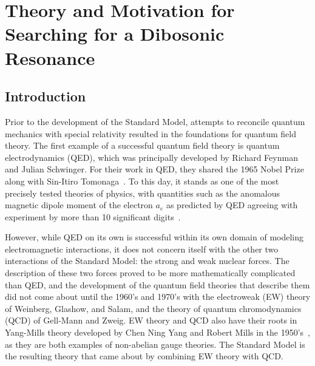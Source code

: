 
\chapter{Theory and Motivation for Searching for a Dibosonic Resonance}
\label{chap:theory}

\section{Introduction}

Prior to the development of the Standard Model, attempts to reconcile quantum mechanics with special relativity resulted in the foundations for quantum field theory.
The first example of a successful quantum field theory is quantum electrodynamics (QED), which was principally developed by Richard Feynman and Julian Schwinger.
For their work in QED, they shared the 1965 Nobel Prize along with Sin-Itiro Tomonaga~\cite{NobelPrize:1965-Physics}.
To this day, it stands as one of the most precisely tested theories of physics, with quantities such as the anomalous magnetic dipole moment of the electron $a_e$ as predicted by QED agreeing with experiment by more than 10 significant digits~\cite{Aoyama_2015}.

However, while QED on its own is successful within its own domain of modeling electromagnetic interactions, it does not concern itself with the other two interactions of the Standard Model: the strong and weak nuclear forces.
The description of these two forces proved to be more mathematically complicated than QED, and the development of the quantum field theories that describe them did not come about until the 1960's and 1970's with the electroweak (EW) theory of Weinberg, Glashow, and Salam, and the theory of quantum chromodynamics (QCD) of Gell-Mann and Zweig.
EW theory and QCD also have their roots in Yang-Mills theory developed by Chen Ning Yang and Robert Mills in the 1950's~\cite{1954PhRv...96..191Y}, as they are both examples of non-abelian gauge theories.
The Standard Model is the resulting theory that came about by combining EW theory with QCD\footnotemark.

